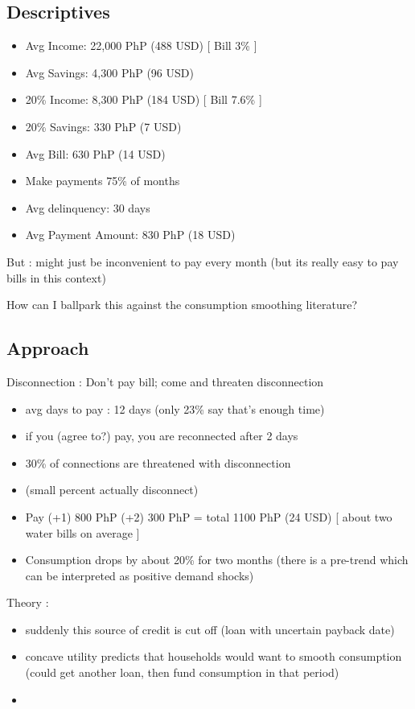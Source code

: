 \documentclass[12pt]{article}
\begin{document}
\subsection{Descriptives}
\begin{itemize}
\item Avg Income: 22,000 PhP (488 USD)   [ Bill 3\% ]
\item Avg Savings: 4,300 PhP (96 USD) 
\item 20\% Income: 8,300 PhP (184 USD)  [ Bill 7.6\% ]
\item 20\% Savings: 330 PhP (7 USD)  
\item Avg Bill: 630 PhP (14 USD)
\item Make payments 75\% of months
\item Avg delinquency: 30 days
\item Avg Payment Amount: 830 PhP (18 USD)
\end{itemize}

But : might just be inconvenient to pay every month (but its really easy to pay bills in this context)

How can I ballpark this against the consumption smoothing literature?

\subsection{Approach}

Disconnection : Don't pay bill; come and threaten disconnection
\begin{itemize}
\item avg days to pay : 12 days (only 23\% say that's enough time)
\item if you (agree to?) pay, you are reconnected after 2 days
\item 30\% of connections are threatened with disconnection
\item (small percent actually disconnect)
\item Pay (+1) 800 PhP (+2) 300 PhP = total 1100 PhP (24 USD) [ about two water bills on average ]
\item Consumption drops by about 20\% for two months (there is a pre-trend which can be interpreted as positive demand shocks)
\end{itemize}

\noindent Theory :
\begin{itemize}
\item suddenly this source of credit is cut off (loan with uncertain payback date)
\item concave utility predicts that households would want to smooth consumption (could get another loan, then fund consumption in that period)
\item 
\end{itemize}





% 
% 
\end{document}
